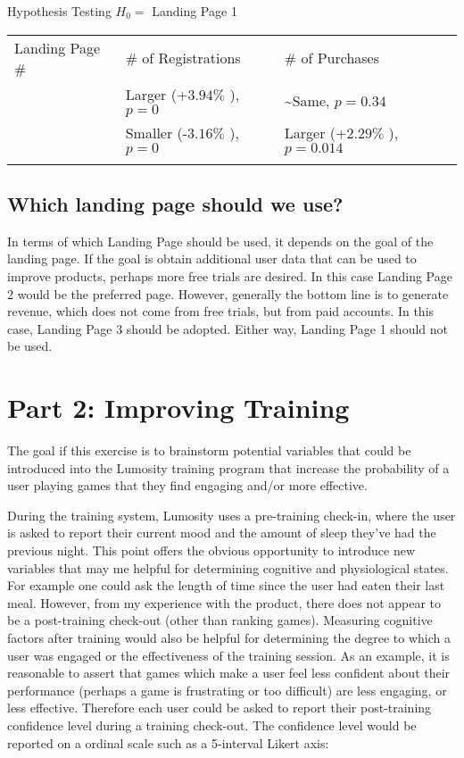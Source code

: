 \documentclass{article}
\begin{document}
    Hypothesis Testing $H_0 =$ Landing Page 1

\begin{longtable}[c]{@{}lll@{}}
\toprule\addlinespace
Landing Page \# & \# of Registrations & \# of Purchases
\\\addlinespace
\midrule\endhead
2 & Larger (+$3.94\%$ ), $p=0$ & \textasciitilde{}Same, $p=0.34$
\\\addlinespace
3 & Smaller (-$3.16\%$ ), $p=0$ & Larger (+$2.29\%$ ), $p=0.014$
\\\addlinespace
\bottomrule
\end{longtable}

\subsection{Which landing page should we
use?}\label{which-landing-page-should-we-use}

In terms of which Landing Page should be used, it depends on the goal of
the landing page. If the goal is obtain additional user data that can be
used to improve products, perhaps more free trials are desired. In this
case Landing Page 2 would be the preferred page. However, generally the
bottom line is to generate revenue, which does not come from free
trials, but from paid accounts. In this case, Landing Page 3 should be
adopted. Either way, Landing Page 1 should not be used.

    \section{Part 2: Improving Training}\label{part-2-improving-training}

The goal if this exercise is to brainstorm potential variables that
could be introduced into the Lumosity training program that increase the
probability of a user playing games that they find engaging and/or more
effective.

During the training system, Lumosity uses a pre-training check-in, where
the user is asked to report their current mood and the amount of sleep
they've had the previous night. This point offers the obvious
opportunity to introduce new variables that may me helpful for
determining cognitive and physiological states. For example one could
ask the length of time since the user had eaten their last meal.
However, from my experience with the product, there does not appear to
be a post-training check-out (other than ranking games). Measuring
cognitive factors after training would also be helpful for determining
the degree to which a user was engaged or the effectiveness of the
training session. As an example, it is reasonable to assert that games
which make a user feel less confident about their performance (perhaps a
game is frustrating or too difficult) are less engaging, or less
effective. Therefore each user could be asked to report their
post-training confidence level during a training check-out. The
confidence level would be reported on a ordinal scale such as a
5-interval Likert axis:
\end{document}
